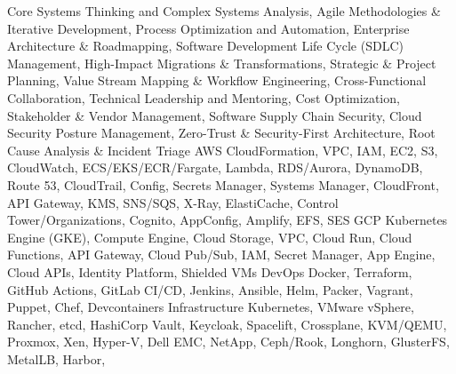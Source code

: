 \begin{cvskills}
    \cvskill
        { Core }
        {
          Systems Thinking and Complex Systems Analysis,
          Agile Methodologies \& Iterative Development,
          Process Optimization and Automation,
          Enterprise Architecture \& Roadmapping,
          Software Development Life Cycle (SDLC) Management,
          High-Impact Migrations \& Transformations,
          Strategic \& Project Planning,
          Value Stream Mapping \& Workflow Engineering,
          Cross-Functional Collaboration,
          Technical Leadership and Mentoring,
          Cost Optimization,
          Stakeholder \& Vendor Management,
          Software Supply Chain Security,
          Cloud Security Posture Management,
          Zero-Trust \& Security-First Architecture,
          Root Cause Analysis \& Incident Triage
        }
    \cvskill
        { AWS }
        {
          CloudFormation,
          VPC,
          IAM,
          EC2,
          S3,
          CloudWatch,
          ECS/EKS/ECR/Fargate,
          Lambda,
          RDS/Aurora,
          DynamoDB,
          Route 53,
          CloudTrail,
          Config,
          Secrets Manager,
          Systems Manager,
          CloudFront,
          API Gateway,
          KMS,
          SNS/SQS,
          X-Ray,
          ElastiCache,
          Control Tower/Organizations,
          Cognito,
          AppConfig,
          Amplify,
          EFS,
          SES
        }
    \cvskill
        { GCP }
        {
          Kubernetes Engine (GKE),
          Compute Engine,
          Cloud Storage,
          VPC,
          Cloud Run,
          Cloud Functions,
          API Gateway,
          Cloud Pub/Sub,
          IAM,
          Secret Manager,
          App Engine,
          Cloud APIs,
          Identity Platform,
          Shielded VMs
        }
    \cvskill
        { DevOps }
        {
          Docker,
          Terraform,
          GitHub Actions,
          GitLab CI/CD,
          Jenkins,
          Ansible,
          Helm,
          Packer,
          Vagrant,
          Puppet,
          Chef,
          Devcontainers
        }
    \cvskill
        { Infrastructure }
        {
          Kubernetes,
          VMware vSphere,
          Rancher,
          etcd,
          HashiCorp Vault,
          Keycloak,
          Spacelift,
          Crossplane,
          KVM/QEMU,
          Proxmox,
          Xen,
          Hyper-V,
          Dell EMC,
          NetApp,
          Ceph/Rook,
          Longhorn,
          GlusterFS,
          MetalLB,
          Harbor,
}
\end{cvskills}
